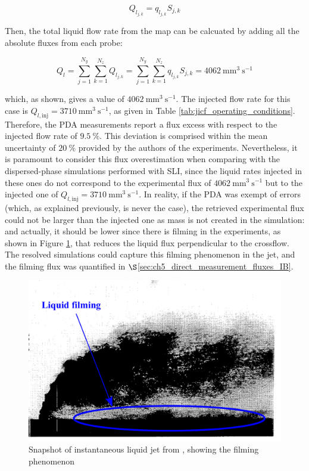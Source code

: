 \begin{equation}
Q_{l_{j,k}} = q_{l_{j,k}} S_{j,k}
\end{equation}

Then, the total liquid flow rate from the map can be calcuated by adding all the absolute fluxes from each probe:

\begin{equation}
\label{eq:ch6_Ql_total_estimation_from_flux_profiles}
Q_{l} = \sum_{j=1}^{N_y} \sum_{k=1}^{N_z} Q_{l_{j,k}} = \sum_{j=1}^{N_y} \sum_{k=1}^{N_z} q_{l_{j,k}} S_{j,k} = 4062 ~ \mathrm{mm}^3~\mathrm{s}^{-1}
\end{equation}

which, as shown, gives a value of $4062 ~ \mathrm{mm}^3~\mathrm{s}^{-1}$. The injected flow rate for this case is $Q_{l,\mathrm{inj}} = 3710~ \mathrm{mm}^3~\mathrm{s}^{-1}$, as given in Table \ref{tab:jicf_operating_conditions}. Therefore, the PDA measurements report a flux excess with respect to the injected flow rate of $9.5~\%$. This deviation is comprised within the mean uncertainty of $20~\%$ provided by the authors of the experiments. Nevertheless, it is paramount to consider this flux overestimation when comparing with the dispersed-phase simulations performed with SLI, since the liquid rates injected in these ones do not correspond to the experimental flux of $4062 ~ \mathrm{mm}^3~\mathrm{s}^{-1}$ but to the injected one of $Q_{l,\mathrm{inj}} = 3710~ \mathrm{mm}^3~\mathrm{s}^{-1}$. In reality, if the PDA was exempt of errors (which, as explained previously, is never the case), the retrieved experimental flux could not be larger than the injected one as mass is not created in the simulation: and actually, it should be lower since there is filming in the experiments, as shown in Figure \ref{fig:jicf_snapshot_expe_filming}, that reduces the liquid flux perpendicular to the crossflow. The resolved simulations could capture this filming phenomenon in the jet, and the filming flux was quantified in $\S$\ref{sec:ch5_direct_measurement_fluxes_IB}.


\begin{figure}[h!]	
	\centering	
	\includegraphics[scale=0.4]{./part2_developments/figures_ch6_lagrangian_JICF/expe_results/snapshot_expe_filming}
	\caption{Snapshot of instantaneous liquid jet from , showing the filming phenomenon}
	\label{fig:jicf_snapshot_expe_filming}
\end{figure}


